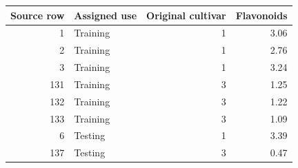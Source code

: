 \begin{tabular}{@{}rlrr@{}}
\toprule
Source row & Assigned use & Original cultivar & Flavonoids \\
\midrule
1 & Training & 1 & 3.06 \\
2 & Training & 1 & 2.76 \\
3 & Training & 1 & 3.24 \\
131 & Training & 3 & 1.25 \\
132 & Training & 3 & 1.22 \\
133 & Training & 3 & 1.09 \\
6 & Testing & 1 & 3.39 \\
137 & Testing & 3 & 0.47 \\
\bottomrule
\end{tabular}
